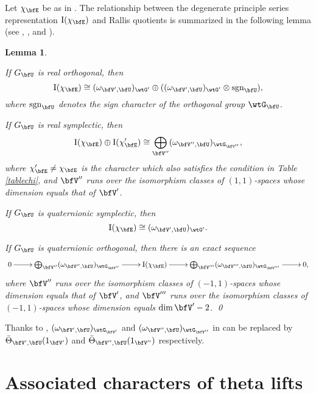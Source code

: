 \documentclass[12pt,a4paper]{amsart}
\newcommand{\RI}{{\mathrm {I}}}
\newcommand{\sgn}{\operatorname{sgn}}
\numberwithin{equation}{section}
\newtheorem{lem}[thm]{Lemma}
\theoremstyle{remark}
\def\abfV{\bfV'}
\def\Thetab{\bar{\Theta}}
\def\tGVar{\wtG'}
\begin{document}
Let $\chi_{\bfE}$ be as in . The relationship between the degenerate principle series representation $\RI(\chi_{\bfE})$ and
Rallis quotients is summarized in the following lemma (see \cite[Theorem 2.4]{Ku}, \cite[Introduction]{LZ1}, \cite[Theorem 6.1]{LZ2} and  \cite[Sections 9 and 10]{Ya}).
\begin{lem}\label{degens}%
\begin{enumC}
\item  \label{it:degens.OR} If $G_\bfU$ is real orthogonal,  then
\[
\RI(\chi_{\bfE})\cong (\omega_{\abfV,\bfU})_{\tGVar} \oplus ( (\omega_{\abfV,\bfU})_{\tGVar} \otimes \sgn_{\bfU}),
\]
where $\sgn_{\bfU}$ denotes the sign character of the orthogonal group $\wtG_{\bfU}$.

\item \label{it:degens.SP} If $G_\bfU$ is real symplectic,  then
\[
    \RI(\chi_{\bfE})\oplus  \RI(\chi'_{\bfE})\cong \bigoplus_{\bfV''} (\omega_{\bfV'',\bfU})_{\wtG_{\bfV''}},
\]
where $\chi'_{\bfE}\neq \chi_{\bfE}$ is the character which also satisfies the condition in Table \ref{tablechi}, and $\bfV''$ runs over the isomorphism classes of $(1,1)$-spaces whose dimension equals that of $\abfV$.

\item \label{it:degens.SPQ}  If $G_\bfU$ is quaternionic symplectic,  then
\[
\RI(\chi_{\bfE})\cong  (\omega_{\abfV,\bfU})_{\tGVar} .
\]

\item \label{it:degens.OQ} If $G_\bfU$ is quaternionic orthogonal,  then there is an exact sequence
\[
\xymatrix{
0\ar[r] &\bigoplus_{\bfV''} (\omega_{\bfV'',\bfU})_{\wtG_{\bfV''}} \ar[r]&
\RI(\chi_{\bfE})  \ar[r]& \bigoplus_{\bfV'''}
(\omega_{\bfV''',\bfU})_{\wtG_{\bfV'''}}\ar[r]& 0,
}
\]
where $\bfV''$ runs over the isomorphism classes of $(-1,1)$-spaces whose
dimension equals that of $\abfV$, and $\bfV'''$ runs over the isomorphism classes
of $(-1,1)$-spaces whose dimension equals $\dim \abfV-2$. \qed
\end{enumC}
\end{lem}

Thanks to ,
$(\omega_{\bfV',\bfU})_{\wtG_{\bfV'}}$
and $(\omega_{\bfV'',\bfU})_{\wtG_{\bfV''}}$ in  can be
replaced by $\Thetab_{\bfV',\bfU}(1_{\bfV'})$ and
$\Thetab_{\bfV'',\bfU}(1_{\bfV''})$ respectively.



\section{Associated characters of theta lifts}\label{sec:AC}
\end{document}
